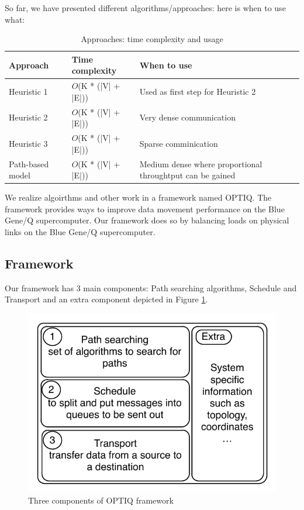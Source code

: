 So far, we have presented different algorithms/approaches: here is when to use what:

\begin{table}[h]
\begin{center}
    \begin{tabular}{ | p{1.6cm} | l | p{3cm} |}
    \hline
    Approach & Time complexity & When to use \\ \hline
    Heuristic 1 & $O$(K * (|V| + |E|)) &  Used as first step for Heuristic 2\\ \hline
    Heuristic 2 & $O$(K * (|V| + |E|)) &  Very dense communication\\ \hline
    Heuristic 3 & $O$(K * (|V| + |E|)) & Sparse comminication \\ \hline
    Path-based model & $O$(K * (|V| + |E|)) & Medium dense where proportional throughtput can be gained \\
    \hline
    \end{tabular}

    \caption{Approaches: time complexity and usage}
    \label{tbl:experiment}

\end{center}
\end{table}

We realize algoirthms and other work in a framework named OPTIQ. The framework provides ways to improve data movement performance on the Blue Gene/Q supercomputer. Our framework does so by balancing loads on physical links on the Blue Gene/Q supercomputer.

\subsection{Framework}

Our framework has 3 main components: Path searching algorithms, Schedule and Transport and an extra component depicted in Figure \ref{fig:framework}.

\begin{figure}[!htb]
\vspace{-0.1in}
\centering
\includegraphics[scale=0.7]{figures/framework.pdf}
\vspace{-0.2in}
\caption{Three components of OPTIQ framework}
\vspace{-0.1in}
\label{fig:framework}
\end{figure}

